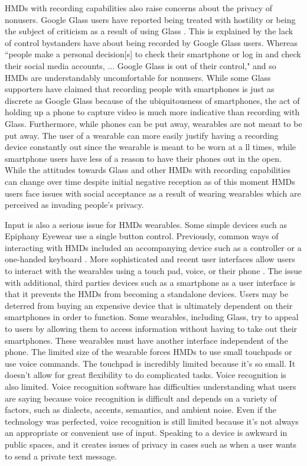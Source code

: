 \documentclass[11pt]{article}
\begin{document}
HMDs with recording capabilities also raise concerns about the privacy of nonusers. Google Glass users have reported being treated with hostility or being the subject of criticism as a result of using Glass \cite{fromCyborgsToGG,negativeGlassReactions}.
This is explained by the lack of control bystanders have about being recorded by Google Glass users. Whereas ``people make a personal decision[s] to check their smartphone or log in and check their social media accounts, ... Google Glass is out of their control," and so HMDs are understandably uncomfortable for nonusers. While some Glass supporters have claimed that recording people with smartphones is just as discrete as Google Glass because of the ubiquitousness of smartphones, the act of holding up a phone to capture video is much more indicative than recording with Glass. Furthermore, while phones can be put away, wearables are not meant to be put away. The user of a wearable can more easily justify having a recording device constantly out since the wearable is meant to be worn at a ll times, while smartphone users have less of a reason to have their phones out in the open. While the attitudes towards Glass and other HMDs with recording capabilities can change over time despite initial negative reception\cite{changingAttitudes} as of this moment HMDs users face issues with social acceptance as a result of wearing wearables which are perceived as invading people's privacy.

Input is also a serious issue for HMDs wearables. Some simple devices such as Epiphany Eyewear use a single button control. Previously, common ways of interacting with HMDs included an accompanying device such as a controller or a one-handed keyboard \cite{inputForHDMs}. More sophisticated and recent user interfaces allow users to interact with the wearables using a  touch pad, voice, or their phone \cite{inputForHDMs,glassHelp,userInteractionMultipleDisplays}. The issue with additional, third parties devices such as a smartphone as a user interface is that it prevents the HMDs from becoming a standalone devices. Users may be deterred from buying an expensive device that is ultimately dependent on their smartphones in order to function. Some wearables, including Glass, try to appeal to users by allowing them to access information without having to take out their smartphones. These wearables must have another interface independent of the phone. The limited size of the wearable forces HMDs to use small touchpads or use voice commands. The touchpad is incredibly limited because it's so small. It doesn't allow for great flexibility to do complicated tasks. Voice recognition is also limited. Voice recognition software has difficulties understanding what users are saying because voice recognition is difficult and depends on a variety of factors, such as dialects, accents, semantics, and ambient noise\cite{voiceRecognitionTroubles}. Even if the technology was perfected, voice recognition is still limited because it's not always an appropriate or convenient use of input. Speaking to a device is awkward in public spaces, and it creates issues of privacy in cases such as when a user wants to send a private text message.
\end{document}
